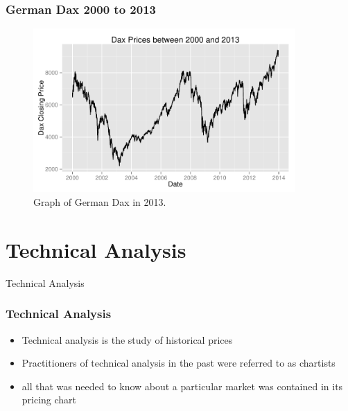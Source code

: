 \documentclass{beamer}
\begin{document}
\begin{frame}
\frametitle{German Dax 2000 to 2013}
\begin{figure}
\centering
\includegraphics[width=10cm]{../Figures/chp3_dax_2000_2013}
\caption{Graph of German Dax in 2013.}
\label{fig:chp3_dax_2000_2013}
\end{figure}

\end{frame}

\section{Technical Analysis} %

\begin{frame}
\Huge{\centerline{Technical Analysis}}
\end{frame}

\begin{frame}
\frametitle{Technical Analysis}
\begin{itemize}
\item Technical analysis is the study of historical prices
\item Practitioners of technical analysis in the past were referred to as chartists
\item all that was needed to know about a particular market was contained in its pricing chart
\end{itemize}

\end{frame}
\end{document}
